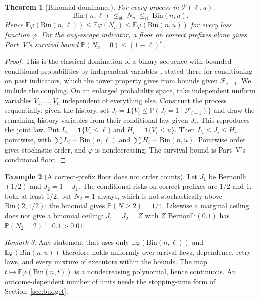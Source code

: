 \documentclass[11pt]{article}
\newtheorem{theorem}{Theorem}
\theoremstyle{definition}
\newtheorem{example}[theorem]{Example}
\theoremstyle{remark}
\newtheorem{remark}[theorem]{Remark}
\newcommand{\Prb}{\mathbb P}
\newcommand{\E}{\mathbb E}
\newcommand{\ind}{\mathbf 1}
\newcommand{\Bin}{\mathrm{Bin}}
\newcommand{\st}{\le_{\mathrm{st}}}
\begin{document}
\begin{theorem}[Binomial dominance]\label{thm:dominance}
For every process in $\mathcal P(\ell,u)$,
\[
\Bin(n,\ell)\ \st\ N_n\ \st\ \Bin(n,u).
\]
Hence $\E\varphi(\Bin(n,\ell))\le\E\varphi(N_n)\le\E\varphi(\Bin(n,u))$ for every loss function
$\varphi$. For the any-escape indicator, a floor on correct prefixes alone gives Part~V's survival
bound $\Prb(N_n=0)\le(1-\ell)^n$.
\end{theorem}
\begin{proof}
This is the classical domination of a binary sequence with bounded conditional probabilities by
independent variables~\cite[Lemma~1.8.7]{doerr}, stated there for conditioning on past indicators,
which the tower property gives from bounds given $\mathcal F_{i-1}$. We include the coupling. On an
enlarged probability space, take independent uniform variables $V_1,\dots,V_n$ independent of
everything else. Construct the process sequentially: given the history, set
$J_i=\ind\{V_i\le\Prb(J_i=1\mid\mathcal F_{i-1})\}$ and draw the remaining history variables from
their conditional law given $J_i$. This reproduces the joint law. Put $L_i=\ind\{V_i\le\ell\}$ and
$H_i=\ind\{V_i\le u\}$. Then $L_i\le J_i\le H_i$ pointwise, with $\sum L_i\sim\Bin(n,\ell)$ and
$\sum H_i\sim\Bin(n,u)$. Pointwise order gives stochastic order, and $\varphi$ is nondecreasing. The
survival bound is Part~V's conditional floor.
\end{proof}

\begin{example}[A correct-prefix floor does not order counts]\label{ex:prefix}
Let $J_1$ be Bernoulli$(1/2)$ and $J_2=1-J_1$. The conditional risks on correct prefixes are $1/2$ and
$1$, both at least $1/2$, but $N_2=1$ always, which is not stochastically above $\Bin(2,1/2)$: the
binomial gives $\Prb(N\ge2)=1/4$. Likewise a marginal ceiling does not give a binomial ceiling:
$J_1=J_2=Z$ with $Z$ Bernoulli$(0.1)$ has $\Prb(N_2=2)=0.1>0.01$.
\end{example}

\begin{remark}
Any statement that uses only $\E\varphi(\Bin(n,\ell))$ and $\E\varphi(\Bin(n,u))$ therefore holds
uniformly over arrival laws, dependence, retry laws, and every mixture of executors within the
bounds. The map $t\mapsto\E\varphi(\Bin(n,t))$ is a nondecreasing polynomial, hence continuous. An
outcome-dependent number of units needs the stopping-time form of Section~\ref{sec:budget}.
\end{remark}
\end{document}

